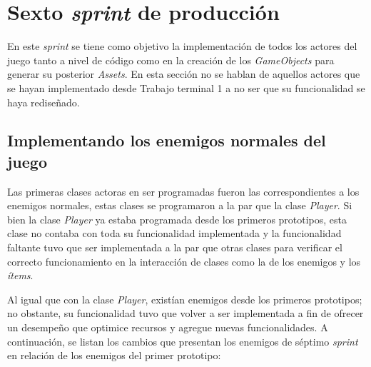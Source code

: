 \section{Sexto \textit{sprint} de producción}
En este \textit{sprint} se tiene como objetivo la implementación de todos los
actores del juego tanto a nivel de código como en la creación de los
\textit{GameObjects} para generar su posterior \textit{Assets}. En esta sección
no se hablan de aquellos actores que se hayan implementado desde Trabajo terminal
1 a no ser que su funcionalidad se haya rediseñado.

\subsection{Implementando los enemigos normales del juego}
Las primeras clases actoras en ser programadas fueron las correspondientes a los
enemigos normales, estas clases se programaron a la par que la clase \textit{Player}.
Si bien la clase \textit{Player} ya estaba programada desde los primeros prototipos,
esta clase no contaba con toda su funcionalidad implementada y la funcionalidad
faltante tuvo que ser implementada a la par que otras clases para verificar el
correcto funcionamiento en la interacción de clases como la de los enemigos y los
\textit{ítems}.
\\
\par
Al igual que con la clase \textit{Player},  existían enemigos desde los primeros prototipos; no obstante,
su funcionalidad tuvo que volver a ser implementada a fin de ofrecer un desempeño que
optimice recursos y agregue nuevas funcionalidades. A continuación, se listan los
cambios que presentan los enemigos de séptimo \textit{sprint} en relación de los
enemigos del primer prototipo:

